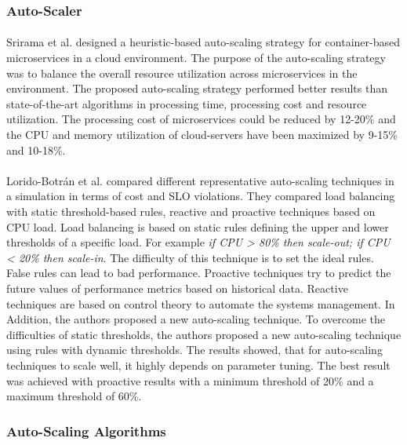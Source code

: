 \subsubsection{Auto-Scaler}
\paragraph{}Srirama et al. \citep{Srirama2020AppDeplyCont} designed a heuristic-based auto-scaling strategy for container-based microservices in a cloud environment. The purpose of the auto-scaling strategy was to balance the overall resource utilization across microservices in the environment.
The proposed auto-scaling strategy performed better results than state-of-the-art algorithms in processing time, processing cost and resource utilization. The processing cost of microservices could be reduced by 12-20\% and the CPU and memory utilization of cloud-servers have been maximized by 9-15\% and 10-18\%.


\paragraph{}Lorido-Botrán et al.  \cite{Botran2013AutoScalingComp} compared different representative auto-scaling techniques in a simulation in terms of cost and SLO violations. They compared load balancing with static threshold-based rules, reactive and proactive techniques based on CPU load.
Load balancing is based on static rules defining the upper and lower thresholds of a specific load. For example \textit{if CPU > 80\% then scale-out; if CPU < 20\% then scale-in}. The difficulty of this technique is to set the ideal rules. False rules can lead to bad performance. Proactive techniques try to predict the future values of performance metrics based on historical data. Reactive techniques are based on control theory to automate the systems management. In Addition, the authors proposed a new auto-scaling technique. To overcome the difficulties of static thresholds, the authors proposed a new auto-scaling technique using rules with dynamic thresholds. The results showed, that for auto-scaling techniques to scale well, it highly depends on parameter tuning. The best result was achieved with proactive results with a minimum threshold of 20\% and a maximum threshold of 60\%.


\subsubsection{Auto-Scaling Algorithms}
